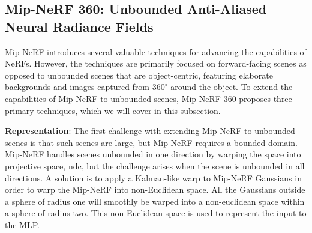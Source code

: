 



\subsection[Mip-NeRF 360]{Mip-NeRF 360: Unbounded Anti-Aliased Neural Radiance Fields} \label{sec:mipnerf360}
Mip-NeRF introduces several valuable techniques for advancing the capabilities of NeRFs. However, the techniques are primarily focused on forward-facing scenes \cite{mildenhall2019llff} as opposed to unbounded scenes that are object-centric, featuring elaborate backgrounds and images captured from $360^\circ$ around the object. To extend the capabilities of Mip-NeRF to unbounded scenes, Mip-NeRF 360 \cite{barron_mip-nerf_2022} proposes three primary techniques, which we will cover in this subsection.

\textbf{Representation}:
The first challenge with extending Mip-NeRF to unbounded scenes is that such scenes are large, but Mip-NeRF requires a bounded domain. Mip-NeRF handles scenes unbounded in one direction by warping the space into projective space, \acrfull{ndc}, but the challenge arises when the scene is unbounded in all directions. A solution is to apply a Kalman-like warp to Mip-NeRF Gaussians in order to warp the Mip-NeRF into non-Euclidean space. All the Gaussians outside a sphere of radius one will smoothly be warped into a non-euclidean space within a sphere of radius two. This non-Euclidean space is used to represent the input to the MLP. 


